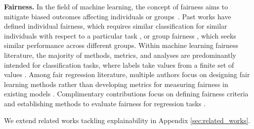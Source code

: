 \textbf{Fairness.}
In the field of machine learning, the concept of fairness aims to mitigate biased outcomes affecting individuals or groups~\citep{mehrabi2022surveybiasfairnessmachine}. Past works have defined individual fairness, which requires similar classification for similar individuals with respect to a particular task \citep{dwork2011fairnessawareness}, or group fairness \citep{dwork2018groupfairness, hardt2016equalityopportunitysupervisedlearning}, which seeks similar performance across different groups. Within machine learning fairness literature, the majority of methods, metrics, and analyses are predominantly intended for classification tasks, where labels take values from a finite set of values \citep{fairness_classification}. Among fair regression literature, multiple authors focus on designing fair learning methods rather than developing metrics for measuring fairness in existing models \citep{berk2017convexframeworkfairregression, Fukuchi2013PredictionWM, pérezsuay2017fairkernellearning, Calders2013ControllingAE}. Complimentary contributions focus on defining fairness criteria and establishing methods to evaluate fairness for regression tasks \citep{gursoy2022errorparityfairnesstesting, agarwal2019fairregressionquantitativedefinitions}.

We extend related works tackling explainability in Appendix \ref{sec:related_works}.

